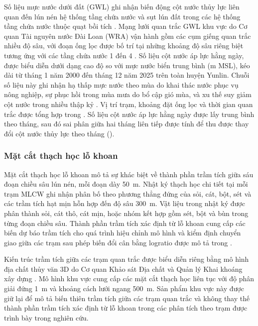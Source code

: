 Số liệu mực nước dưới đất (GWL) ghi nhận biến động cột nước thủy lực liên quan đến lún nén hệ thống tầng chứa nước và sụt lún đất trong các hệ thống tầng chứa nước thuộc quạt bồi tích \citep{galloway_land_1999, gambolati_2015, herrera-garcia_mapping_2021, bagheri-gavkoshLandSubsidenceGlobal2021}. Mạng lưới quan trắc GWL khu vực do Cơ quan Tài nguyên nước Đài Loan (WRA) vận hành gồm các cụm giếng quan trắc nhiều độ sâu, với đoạn ống lọc được bố trí tại những khoảng độ sâu riêng biệt tương ứng với các tầng chứa nước 1 đến 4 \citep{survey_project_1999, liu_characterization_2004}. Số liệu cột nước áp lực hằng ngày, được biểu diễn dưới dạng cao độ so với mực nước biển trung bình (m MSL), kéo dài từ tháng 1 năm 2000 đến tháng 12 năm 2025 trên toàn huyện Yunlin. Chuỗi số liệu này ghi nhận hạ thấp mực nước theo mùa do khai thác nước phục vụ nông nghiệp, sự phục hồi trong mùa mưa do bổ cập gió mùa, và xu thế suy giảm cột nước trong nhiều thập kỷ \citep{chang2022_wetanddry, lu2020_crfp}. Vị trí trạm, khoảng đặt ống lọc và thời gian quan trắc được tổng hợp trong . Số liệu cột nước áp lực hằng ngày được lấy trung bình theo tháng, sau đó sai phân giữa hai tháng liên tiếp được tính để thu được thay đổi cột nước thủy lực theo tháng ().

\subsubsection{Mặt cắt thạch học lỗ khoan}

Mặt cắt thạch học lỗ khoan mô tả sự khác biệt về thành phần trầm tích giữa sáu đoạn chiều sâu lún nén, mỗi đoạn dày 50~m. Nhật ký thạch học chi tiết tại mỗi trạm MLCW ghi nhận phân bố theo phương thẳng đứng của sỏi, cát, bột, sét và các trầm tích hạt mịn hỗn hợp đến độ sâu 300~m. Vật liệu trong nhật ký được phân thành sỏi, cát thô, cát mịn, hoặc nhóm kết hợp gồm sét, bột và bùn trong từng đoạn chiều sâu. Thành phần trầm tích xác định từ lỗ khoan cung cấp các biến dự báo trầm tích cho quá trình hiệu chỉnh mô hình và kiểm định chuyển giao giữa các trạm sau phép biến đổi cân bằng logratio được mô tả trong .

Kiến trúc trầm tích giữa các trạm quan trắc được biểu diễn riêng bằng mô hình địa chất thủy văn 3D do Cơ quan Khảo sát Địa chất và Quản lý Khai khoáng xây dựng \citep{gsmma_3d}. %
Mô hình khu vực cung cấp các mặt cắt thạch học liên tục với độ phân giải đứng 1~m và khoảng cách lưới ngang 500~m. Sản phẩm khu vực này được giữ lại để mô tả biến thiên trầm tích giữa các trạm quan trắc và không thay thế thành phần trầm tích xác định từ lỗ khoan trong các phân tích theo trạm được trình bày trong nghiên cứu.

